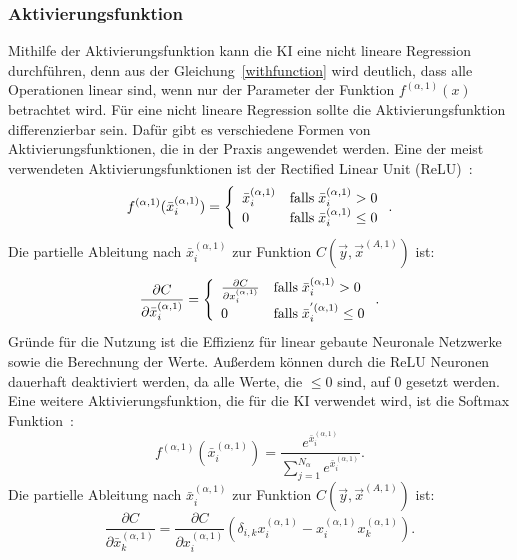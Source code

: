 \documentclass[11pt]{article}
\begin{document}
\subsubsection{Aktivierungsfunktion}\label{activation}
Mithilfe der Aktivierungsfunktion kann die KI eine nicht lineare Regression durchführen, denn aus der Gleichung~\ref{withfunction} wird deutlich,
dass alle Operationen linear sind, wenn nur der Parameter der Funktion $f^{(\alpha,1)}(x)$ betrachtet wird. Für eine nicht lineare Regression sollte die
Aktivierungsfunktion differenzierbar sein. Dafür gibt es verschiedene Formen von Aktivierungsfunktionen, die in der Praxis angewendet werden.
Eine der meist verwendeten Aktivierungsfunktionen ist der Rectified Linear Unit (ReLU)~\cite{14}:
\begin{equation}
    f^{(\alpha,1)}(\bar{x}_{i}^{(\alpha,1)}) = \left\{
	\begin{array}{ll}
		\bar{x}_i^{(\alpha,1)}  & \mathrm{falls} \mkern5mu \bar{x}_i^{(\alpha,1)} > 0 \\
		0 & \mathrm{falls} \mkern5mu \bar{x}_i^{(\alpha,1)} \leq 0
	\end{array}
    \right..
\end{equation}
Die partielle Ableitung nach $\bar{x}_i^{(\alpha,1)}$ zur Funktion $C(\vec{y},\vec{x}^{(A,1)})$ ist:
\begin{equation}
    \frac{\partial C}{\partial \bar{x}_i^{(\alpha,1)}} = \left\{
	\begin{array}{ll}
		\frac{\partial C}{\partial {x}_i^{(\alpha,1)}}  & \mathrm{falls} \mkern5mu \bar{x}_i^{(\alpha,1)} > 0 \\
		0 & \mathrm{falls} \mkern5mu \bar{x}_i^{'(\alpha,1)} \leq 0
	\end{array}
    \right..
\end{equation}
Gründe für die Nutzung ist die Effizienz für linear gebaute Neuronale Netzwerke sowie die Berechnung der Werte. Außerdem können durch die ReLU
Neuronen dauerhaft deaktiviert werden, da alle Werte, die $\leq 0$ sind, auf $0$ gesetzt werden.
Eine weitere Aktivierungsfunktion, die für die KI verwendet wird, ist die Softmax Funktion~\cite{14}:
\begin{equation}\label{softmax}
    f^{(\alpha,1)}(\bar{x}_{i}^{(\alpha,1)}) = \frac{e^{\bar{x}_i^{(\alpha,1)}}}{\sum_{j=1}^{N_{\alpha}} e^{\bar{x}_i^{(\alpha,1)}}}.
\end{equation}
Die partielle Ableitung nach $\bar{x}_i^{(\alpha,1)}$ zur Funktion $C(\vec{y},\vec{x}^{(A,1)})$ ist:
\begin{equation}
    \frac{\partial C}{\partial \bar{x}_k^{(\alpha,1)}} = \frac{\partial C}{\partial {x}_i^{(\alpha,1)}} (\delta_{i,k}x_{i}^{(\alpha,1)}-x_{i}^{(\alpha,1)}x_{k}^{(\alpha,1)}).
\end{equation}
\end{document}
